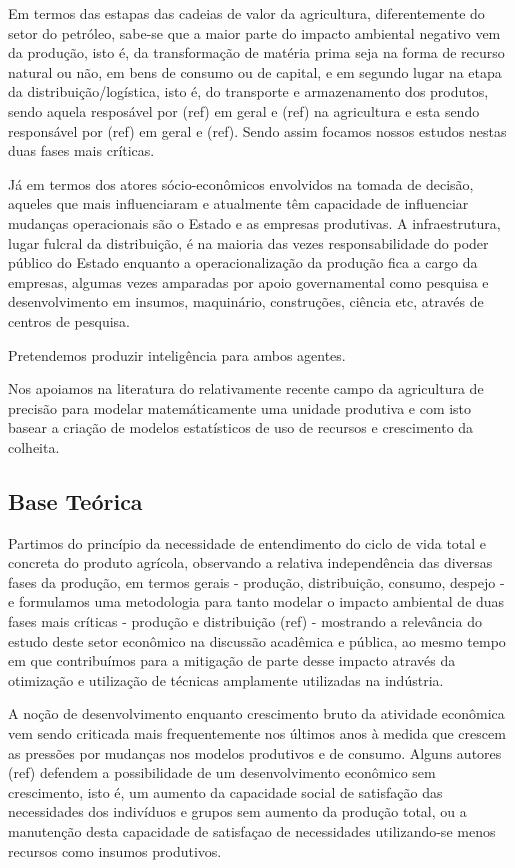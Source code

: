 \documentclass[14pt,a4paper]{article}
\begin{document}
	Em termos das estapas das cadeias de valor da agricultura, diferentemente do setor do petróleo, sabe-se que a maior parte do impacto ambiental negativo vem da produção, isto é, da transformação de matéria prima seja na forma de recurso natural ou não, em bens de consumo ou de capital, e em segundo lugar na etapa da distribuição/logística, isto é, do transporte e armazenamento dos produtos, sendo aquela resposável por (ref) em geral e (ref) na agricultura e esta sendo responsável por (ref) em geral e (ref). Sendo assim focamos nossos estudos nestas duas fases mais críticas. 
	
	Já em termos dos atores sócio-econômicos envolvidos na tomada de decisão, aqueles que mais influenciaram e atualmente têm capacidade de influenciar mudanças operacionais são o Estado e as empresas produtivas. A infraestrutura, lugar fulcral da distribuição, é na maioria das vezes responsabilidade do poder público do Estado enquanto a operacionalização da produção fica a cargo da empresas, algumas vezes amparadas por apoio governamental como pesquisa e desenvolvimento em insumos, maquinário, construções, ciência etc, através de centros de pesquisa.
	
	Pretendemos produzir inteligência para ambos agentes.
	
	Nos apoiamos na literatura do relativamente recente campo da agricultura de precisão para modelar matemáticamente uma unidade produtiva e com isto basear a criação de modelos estatísticos de uso de recursos e crescimento da colheita.
	
	\subsection{Base Teórica}

		Partimos do princípio da necessidade de entendimento do ciclo de vida total e concreta do produto agrícola, observando a relativa independência das diversas fases da produção, em termos gerais - produção, distribuição, consumo, despejo - e formulamos uma metodologia para tanto modelar o impacto ambiental de duas fases mais críticas - produção e distribuição (ref) - mostrando a relevância do estudo deste setor econômico na discussão acadêmica e pública, ao mesmo tempo em que contribuímos para a mitigação de parte desse impacto através da otimização e utilização de técnicas amplamente utilizadas na indústria.

		A noção de desenvolvimento enquanto crescimento bruto da atividade econômica vem sendo criticada mais frequentemente nos últimos anos à medida que crescem as pressões por mudanças nos modelos produtivos e de consumo. Alguns autores (ref) defendem a possibilidade de um desenvolvimento econômico sem crescimento, isto é, um aumento da capacidade social de satisfação das necessidades dos indivíduos e grupos sem aumento da produção total, ou a manutenção desta capacidade de satisfaçao de necessidades utilizando-se menos recursos como insumos produtivos.
		
\end{document}
